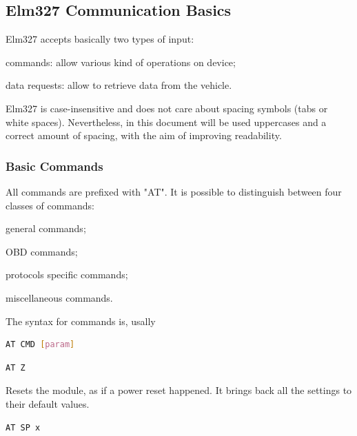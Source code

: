 \documentclass[twoside]{article}
\begin{document}
\begin{multicols}{2}
\subsection{Elm327 Communication Basics}

Elm327 accepts basically two types of input:
\begin{compactitem}
  \item commands: allow various kind of operations on device;
  \item data requests: allow to retrieve data from the vehicle.
\end{compactitem}

Elm327 is case-insensitive and does not care about spacing symbols (tabs or white spaces).
Nevertheless, in this document will be used uppercases and a correct amount of spacing, with the aim of improving readability.

\subsubsection{Basic Commands}

All commands are prefixed with "AT". It is possible to distinguish between four classes of commands:
\begin{compactitem}
  \item general commands;
  \item OBD commands;
  \item protocols specific commands;
  \item miscellaneous commands.
\end{compactitem}

The syntax for commands is, usally
\begin{lstlisting}[language=bash]
AT CMD [param]
\end{lstlisting}

\begin{lstlisting}[language=bash]
AT Z
\end{lstlisting}

Resets the module, as if a power reset happened.
It brings back all the settings to their default values.

\begin{lstlisting}[language=bash]
AT SP x
\end{lstlisting}


\end{multicols}
\end{document}
